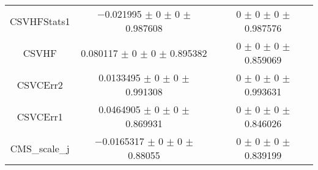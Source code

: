 \begin{table}
\begin{tabular}{ccc}
CSVHFStats1 	& \num{-0.021995} $\pm$ \num{0} $\pm$ \num{0} $\pm$ \num{0.987608} 	& \num{0} $\pm$ \num{0} $\pm$ \num{0} $\pm$ \num{0.987576}\\
CSVHF 	& \num{0.080117} $\pm$ \num{0} $\pm$ \num{0} $\pm$ \num{0.895382} 	& \num{0} $\pm$ \num{0} $\pm$ \num{0} $\pm$ \num{0.859069}\\
CSVCErr2 	& \num{0.0133495} $\pm$ \num{0} $\pm$ \num{0} $\pm$ \num{0.991308} 	& \num{0} $\pm$ \num{0} $\pm$ \num{0} $\pm$ \num{0.993631}\\
CSVCErr1 	& \num{0.0464905} $\pm$ \num{0} $\pm$ \num{0} $\pm$ \num{0.869931} 	& \num{0} $\pm$ \num{0} $\pm$ \num{0} $\pm$ \num{0.846026}\\
CMS\_scale\_j 	& \num{-0.0165317} $\pm$ \num{0} $\pm$ \num{0} $\pm$ \num{0.88055} 	& \num{0} $\pm$ \num{0} $\pm$ \num{0} $\pm$ \num{0.839199}\\
\bottomrule
\end{tabular}
\end{table}